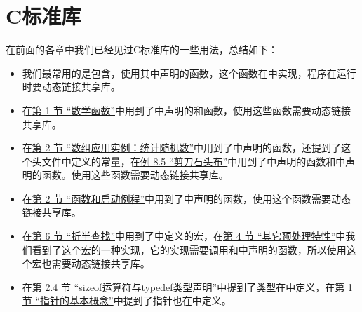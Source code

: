 

\chapter{C标准库}
%
在前面的各章中我们已经见过C标准库的一些用法，总结如下：


\begin{itemize}

\item 我们最常用的是包含，使用其中声明的函数，这个函数在中实现，程序在运行时要动态链接共享库。

\item 在\hyperlink{db.ch03s01.id2712397}{第 1 节 “数学函数”}中用到了中声明的和函数，使用这些函数需要动态链接共享库。

\item 在\hyperlink{db.ch08s02.id2733695}{第 2 节 “数组应用实例：统计随机数”}中用到了中声明的函数，还提到了这个头文件中定义的常量，在\hyperlink{db.ch08s05.id2735200}{例 8.\BookSplit{}5 “剪刀石头布”}中用到了中声明的函数和中声明的函数。使用这些函数需要动态链接共享库。

\item 在\hyperlink{db.ch19s02.id2776173}{第 2 节 “函数和启动例程”}中用到了中声明的函数，使用这个函数需要动态链接共享库。

\item 在\hyperlink{db.ch11s06.id2746698}{第 6 节 “折半查找”}中用到了中定义的宏，在\hyperlink{db.ch21s04.id2799358}{第 4 节 “其它预处理特性”}中我们看到了这个宏的一种实现，它的实现需要调用和中声明的函数，所以使用这个宏也需要动态链接共享库。

\item 在\hyperlink{db.ch16s02.id2762676}{第 2.\BookSplit{}4 节 “sizeof运算符与typedef类型声明”}中提到了类型在中定义，在\hyperlink{db.ch23s01.id2809880}{第 1 节 “指针的基本概念”}中提到了指针也在中定义。


\end{itemize}

